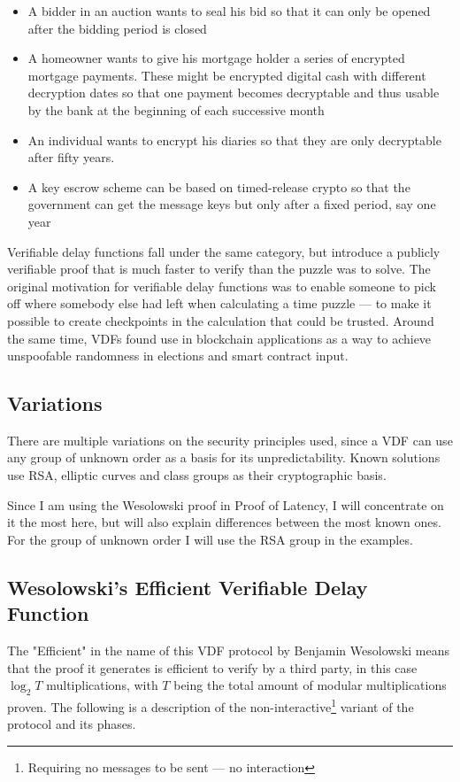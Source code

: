 \begin{itemize}
	\item A bidder in an auction wants to seal his bid so that it can only be opened after the bidding period is closed 
	\item A homeowner wants to give his mortgage holder a series of encrypted mortgage payments. These might be encrypted digital cash with different decryption dates so that one payment becomes decryptable and thus usable by the bank at the beginning of each successive month
	\item An individual wants to encrypt his diaries so that they are only decryptable after fifty years.
	\item A key escrow scheme can be based on timed-release crypto so that the government can get the message keys but only after a fixed period, say one year
\end{itemize}

Verifiable delay functions fall under the same category, but introduce a publicly verifiable proof that is much faster to verify than the puzzle was to solve. The original motivation for verifiable delay functions was to enable someone to pick off where somebody else had left when calculating a time puzzle --- to make it possible to create checkpoints in the calculation that could be trusted. Around the same time, VDFs found use in blockchain applications as a way to achieve unspoofable randomness in elections and smart contract input.


\subsection{Variations}
There are multiple variations on the security principles used, since a VDF can use any group of unknown order as a basis for its unpredictability. Known solutions use RSA, elliptic curves and class groups as their cryptographic basis.


Since I am using the Wesolowski proof in Proof of Latency, I will concentrate on it the most here, but will also explain differences between the most known ones. For the group of unknown order I will use the RSA group in the examples.

\subsection{Wesolowski's Efficient Verifiable Delay Function}
The "Efficient" in the name of this VDF protocol by Benjamin Wesolowski means that the proof it generates is efficient to verify by a third party, in this case \( \log _{2} T \) multiplications, with \( T \) being the total amount of modular multiplications proven. The following is a description of the non-interactive\footnote{Requiring no messages to be sent --- no interaction} variant of the protocol and its phases.

